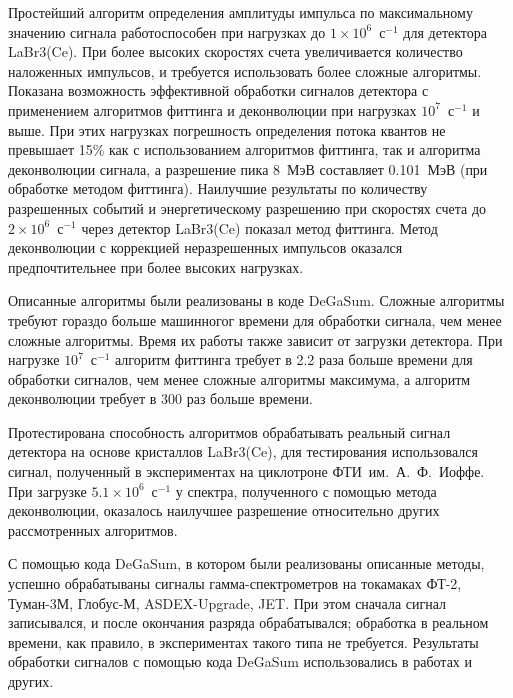 Простейший алгоритм определения амплитуды импульса по максимальному значению сигнала работоспособен при нагрузках до $1 \times 10^6$~с${}^{-1}$ для детектора LaBr3(Ce). При более высоких скоростях счета увеличивается количество наложенных импульсов, и требуется использовать более сложные алгоритмы. Показана возможность эффективной обработки сигналов детектора с применением алгоритмов фиттинга и деконволюции при нагрузках $10^7$~с${}^{-1}$ и выше. При этих нагрузках погрешность определения потока квантов не превышает 15\% как с использованием алгоритмов фиттинга, так и алгоритма деконволюции сигнала, а разрешение пика 8~МэВ составляет 0.101~МэВ (при обработке методом фиттинга). Наилучшие результаты по количеству разрешенных событий и энергетическому разрешению при скоростях счета до $2 \times 10^6$~с${}^{-1}$ через детектор LaBr3(Ce) показал метод фиттинга. Метод деконволюции с коррекцией неразрешенных импульсов оказался предпочтительнее при более высоких нагрузках.

Описанные алгоритмы были реализованы в коде DeGaSum. Сложные алгоритмы требуют гораздо больше машинногог времени для обработки сигнала, чем менее сложные алгоритмы. Время их работы также зависит от загрузки детектора. При нагрузке $10^7$~с${}^{-1}$ алгоритм фиттинга требует в 2.2 раза больше времени для обработки сигналов, чем менее сложные алгоритмы максимума, а алгоритм деконволюции требует в 300 раз больше времени. 

Протестирована способность алгоритмов обрабатывать реальный сигнал детектора на основе кристаллов LaBr3(Ce), для тестирования использовался сигнал, полученный в экспериментах на циклотроне ФТИ~им.~А.~Ф.~Иоффе. При загрузке $5.1 \times 10^6$~с${}^{-1}$ у спектра, полученного с помощью метода деконволюции, оказалось наилучшее разрешение относительно других рассмотренных алгоритмов.

С помощью кода DeGaSum, в котором были реализованы описанные методы, успешно обрабатываны сигналы гамма-спектрометров на токамаках ФТ-2, Туман-3М, Глобус-М, ASDEX-Upgrade, JET. При этом сначала сигнал записывался, и после окончания разряда обрабатывался; обработка в реальном времени, как правило, в экспериментах такого типа не требуется. Результаты обработки сигналов с помощью кода DeGaSum использовались в работах \cite{Shevelev2016,Shevelev2017,Shevelev2018,Shevelev2013,Iliasova2020,Skrekel2021} и других.

\FloatBarrier
